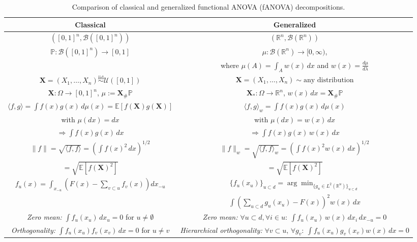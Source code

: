 \begin{table}[htbp]
\centering
\begin{adjustbox}{max width=\textwidth}
\renewcommand{\arraystretch}{2.0}
\begin{tabular}{|c|c|}
\hline
\textbf{Classical} & \textbf{Generalized} \\
\hline
$([0,1]^n, \mathcal{B}([0,1]^n))$ & $(\mathbb{R}^n, \mathcal{B}(\mathbb{R}^n))$ \\
\hline
$\mathbb{P}: \mathcal{B}([0,1]^n) \rightarrow [0,1]$ & 
$\mu: \mathcal{B}(\mathbb{R}^n) \rightarrow [0,\infty)$, \\
& where $\mu(A) = \int_A w(x)\,dx$ and $w(x) = \frac{d\mu}{d\lambda}$ \\
\hline
$\mathbf{X} = (X_1, \dots, X_n) \overset{\text{iid}}{\sim} \mathcal{U}([0,1])$ & 
$\mathbf{X} = (X_1, \dots, X_n) \sim \text{any distribution}$ \\
\hline
$\mathbf{X}: \Omega \rightarrow [0,1]^n$, $\mu := \mathbf{X}_\# \mathbb{P}$ & 
$\mathbf{X}_*: \Omega \rightarrow \mathbb{R}^n$, $w(x)\,dx = \mathbf{X}_\# \mathbb{P}$ \\
\hline
$\langle f, g \rangle = \int f(x)g(x)\,d\mu(x) = \mathbb{E}[f(\mathbf{X})g(\mathbf{X})]$ & 
$\langle f, g \rangle_w = \int f(x)g(x)\,d\mu(x)$ \\
with $\mu(dx) = dx$ & with $\mu(dx) = w(x)\,dx$ \\
$\Rightarrow \int f(x)g(x)\,dx$ & $\Rightarrow \int f(x)g(x)\,w(x)\,dx$ \\
\hline
$\|f\| = \sqrt{\langle f, f \rangle} = \left( \int f(x)^2\,dx \right)^{1/2}$ & 
$\|f\|_w = \sqrt{\langle f, f \rangle_w} = \left( \int f(x)^2 w(x)\,dx \right)^{1/2}$ \\
$= \sqrt{\mathbb{E}[f(\mathbf{X})^2]}$ & $= \sqrt{\mathbb{E}[f(\mathbf{X})^2]}$ \\
\hline
$f_u(x) = \int_{x_{-u}} \left( F(x) - \sum_{v \subset u} f_v(x) \right) dx_{-u}$ & 
$\{f_u(x_u)\}_{u \subset d} = \arg\min_{\{g_u \in L^2(\mathbb{R}^u)\}_{u \subset d}}$ \\
& $\int \left( \sum_{u \subset d} g_u(x_u) - F(x) \right)^2 w(x)\,dx$ \\
\hline
\textit{Zero mean:} $\int f_u(x_u)\,dx_u = 0$ for $u \neq \emptyset$ & 
\textit{Zero mean:} $\forall u \subset d, \forall i \in u:\ \int f_u(x_u)\,w(x)\,dx_i\,dx_{-u} = 0$ \\
\hline
\textit{Orthogonality:} $\int f_u(x_u) f_v(x_v)\,dx = 0$ for $u \ne v$ & 
\textit{Hierarchical orthogonality:} $\forall v \subset u,\, \forall g_v:\ \int f_u(x_u) g_v(x_v) w(x)\,dx = 0$ \\
\hline
\end{tabular}
\end{adjustbox}
\caption{Comparison of classical and generalized functional ANOVA (fANOVA) decompositions.}
\label{tab:fanova_comparison}
\end{table}





